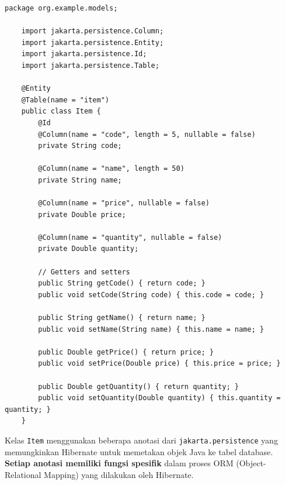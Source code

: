 \begin{lstlisting}[style=JavaStyle]
	package org.example.models;
	
	import jakarta.persistence.Column;
	import jakarta.persistence.Entity;
	import jakarta.persistence.Id;
	import jakarta.persistence.Table;
	
	@Entity
	@Table(name = "item")
	public class Item {
		@Id
		@Column(name = "code", length = 5, nullable = false)
		private String code;
		
		@Column(name = "name", length = 50)
		private String name;
		
		@Column(name = "price", nullable = false)
		private Double price;
		
		@Column(name = "quantity", nullable = false)
		private Double quantity;
		
		// Getters and setters
		public String getCode() { return code; }
		public void setCode(String code) { this.code = code; }
		
		public String getName() { return name; }
		public void setName(String name) { this.name = name; }
		
		public Double getPrice() { return price; }
		public void setPrice(Double price) { this.price = price; }
		
		public Double getQuantity() { return quantity; }
		public void setQuantity(Double quantity) { this.quantity = quantity; }
	}
\end{lstlisting}

Kelas \texttt{Item} menggunakan beberapa anotasi dari \texttt{jakarta.persistence} yang memungkinkan Hibernate untuk memetakan objek Java ke tabel database. \textbf{Setiap anotasi memiliki fungsi spesifik} dalam proses ORM (Object-Relational Mapping) yang dilakukan oleh Hibernate.

